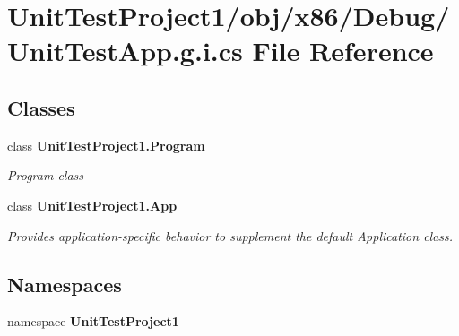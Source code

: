 \section{Unit\+Test\+Project1/obj/x86/\+Debug/\+Unit\+Test\+App.g.\+i.\+cs File Reference}
\label{UnitTestApp_8g_8i_8cs}
\subsection*{Classes}
\begin{DoxyCompactItemize}
\item 
class {\bfseries Unit\+Test\+Project1.\+Program}
\begin{DoxyCompactList}\small\item\em Program class \end{DoxyCompactList}\item 
class \textbf{ Unit\+Test\+Project1.\+App}
\begin{DoxyCompactList}\small\item\em Provides application-\/specific behavior to supplement the default Application class. \end{DoxyCompactList}\end{DoxyCompactItemize}
\subsection*{Namespaces}
\begin{DoxyCompactItemize}
\item 
namespace \textbf{ Unit\+Test\+Project1}
\end{DoxyCompactItemize}

